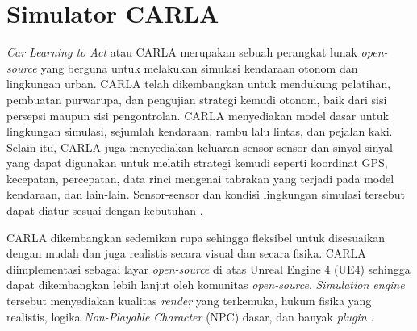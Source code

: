 

\section{Simulator CARLA}

\textit{Car Learning to Act} atau CARLA merupakan sebuah perangkat lunak
\textit{open-source} yang berguna untuk melakukan simulasi kendaraan otonom dan
lingkungan urban. CARLA telah dikembangkan untuk mendukung pelatihan, pembuatan
purwarupa, dan pengujian strategi kemudi otonom, baik dari sisi persepsi maupun
sisi pengontrolan. CARLA menyediakan model dasar untuk lingkungan simulasi,
sejumlah kendaraan, rambu lalu lintas, dan pejalan kaki. Selain itu, CARLA juga
menyediakan keluaran sensor-sensor dan sinyal-sinyal yang dapat digunakan untuk
melatih strategi kemudi seperti koordinat GPS, kecepatan, percepatan, data rinci
mengenai tabrakan yang terjadi pada model kendaraan, dan lain-lain.
Sensor-sensor dan kondisi lingkungan simulasi tersebut dapat diatur sesuai
dengan kebutuhan \parencite{carla-dosovitskiy}.

CARLA dikembangkan sedemikan rupa sehingga fleksibel untuk disesuaikan dengan
mudah dan juga realistis secara visual dan secara fisika. CARLA diimplementasi
sebagai layar \textit{open-source} di atas Unreal Engine 4 (UE4) sehingga dapat
dikembangkan lebih lanjut oleh komunitas \textit{open-source}.
\textit{Simulation engine} tersebut menyediakan kualitas \textit{render} yang
terkemuka, hukum fisika yang realistis, logika \textit{Non-Playable Character}
(NPC) dasar, dan banyak \textit{plugin} \parencite{carla-dosovitskiy}.

